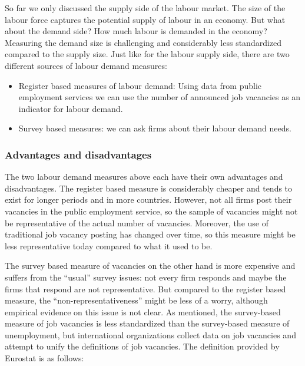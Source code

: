\documentclass[
]{book}
\providecommand{\tightlist}{%
  \setlength{\itemsep}{0pt}\setlength{\parskip}{0pt}}
\begin{document}
So far we only discussed the supply side of the labour market. The size of the labour force captures the potential supply of labour in an economy. But what about the demand side? How much labour is demanded in the economy? Measuring the demand size is challenging and considerably less standardized compared to the supply size. Just like for the labour supply side, there are two different sources of labour demand measures:

\begin{itemize}
\tightlist
\item
  Register based measures of labour demand: Using data from public employment services we can use the number of announced job vacancies as an indicator for labour demand.
\item
  Survey based measures: we can ask firms about their labour demand needs.
\end{itemize}

\hypertarget{advantages-and-disadvantages}{%
\subsubsection*{Advantages and disadvantages}\label{advantages-and-disadvantages}}

The two labour demand measures above each have their own advantages and disadvantages. The register based measure is considerably cheaper and tends to exist for longer periods and in more countries. However, not all firms post their vacancies in the public employment service, so the sample of vacancies might not be representative of the actual number of vacancies. Moreover, the use of traditional job vacancy posting has changed over time, so this measure might be less representative today compared to what it used to be.

The survey based measure of vacancies on the other hand is more expensive and suffers from the ``usual'' survey issues: not every firm responds and maybe the firms that respond are not representative. But compared to the register based measure, the ``non-representativeness'' might be less of a worry, although empirical evidence on this issue is not clear. As mentioned, the survey-based measure of job vacancies is less standardized than the survey-based measure of unemployment, but international organizations collect data on job vacancies and attempt to unify the definitions of job vacancies. The definition provided by Eurostat is as follows:
\end{document}
